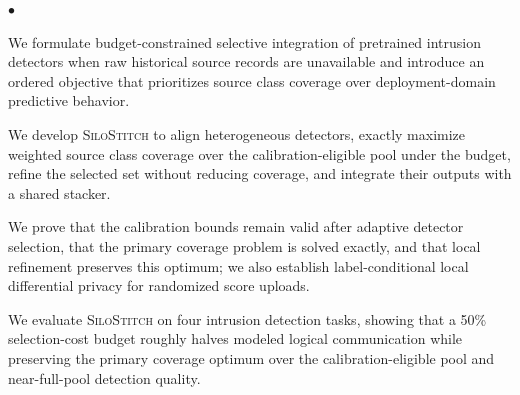 \documentclass[conference]{IEEEtran}
\theoremstyle{definition}
\newcommand{\Fname}{\textsc{SiloStitch}\xspace}
\newenvironment{packeditemize}{
\begin{list}{$\bullet$}{
\setlength{\labelwidth}{8pt}
\setlength{\itemsep}{0pt}
\setlength{\leftmargin}{\labelwidth}
\addtolength{\leftmargin}{\labelsep}
\setlength{\parindent}{0pt}
\setlength{\listparindent}{\parindent}
\setlength{\parsep}{0pt}
\setlength{\topsep}{3pt}}}{\end{list}}
\begin{document}
\begin{packeditemize}
\item We formulate budget-constrained selective integration of pretrained intrusion detectors when raw historical source records are unavailable and introduce an ordered objective that prioritizes source class coverage over deployment-domain predictive behavior.

\item We develop \Fname to align heterogeneous detectors, exactly maximize weighted source class coverage over the calibration-eligible pool under the budget, refine the selected set without reducing coverage, and integrate their outputs with a shared stacker.

\item We prove that the calibration bounds remain valid after adaptive detector selection, that the primary coverage problem is solved exactly, and that local refinement preserves this optimum; we also establish label-conditional local differential privacy for randomized score uploads.

\item We evaluate \Fname on four intrusion detection tasks, showing that a 50\% selection-cost budget roughly halves modeled logical communication while preserving the primary coverage optimum over the calibration-eligible pool and near-full-pool detection quality.
\end{packeditemize}
\end{document}
